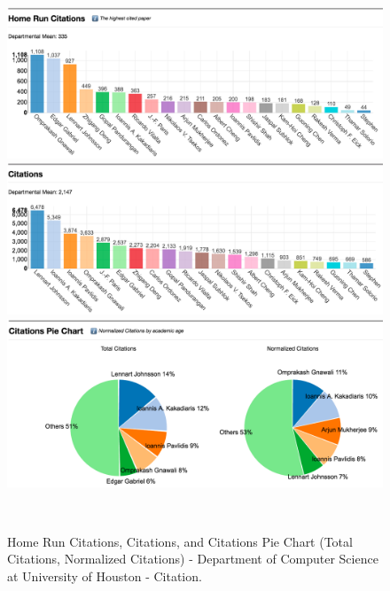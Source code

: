 \begin{figure}
  \centering
  \includegraphics[width=1\textwidth]{figures/Dept-Cit-HD}
  \includegraphics[width=1\textwidth]{figures/Dept-Cit-HD2}
  \includegraphics[width=1\textwidth]{figures/Dept-Cit-HD3}
 
  \caption{Home Run Citations, Citations, and Citations Pie Chart (Total Citations, Normalized Citations) - Department of Computer Science at University of Houston - Citation.}~\label{fig:DP-College1}
\end{figure}

